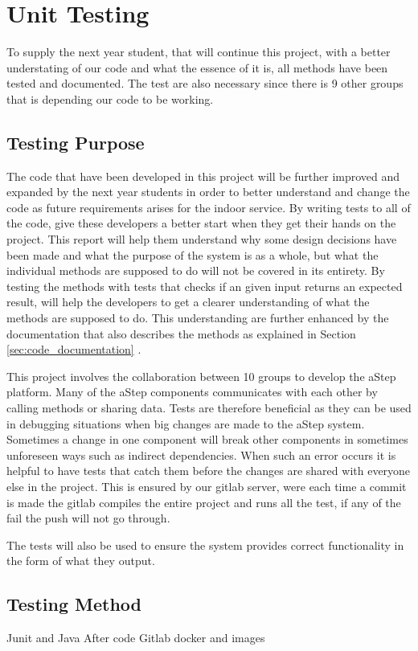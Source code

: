 \section{Unit Testing}
To supply the next year student, that will continue this project, with a better understating of our code and what the essence of it is, all methods have been tested and documented. 
The test are also necessary since there is 9 other groups that is depending our code to be working.

\subsection{Testing Purpose}
The code that have been developed in this project will be further improved and expanded by the next year students in order to better understand and change the code as future requirements arises for the indoor service. 
By writing tests to all of the code, give these developers a better start when they get their hands on the project. 
This report will help them understand why some design decisions have been made and what the purpose of the system is as a whole, but what the individual methods are supposed to do will not be covered in its entirety. 
By testing the methods with tests that checks if an given input returns an expected result, will help the developers to get a clearer understanding of what the methods are supposed to do. 
This understanding are further enhanced by the documentation that also describes the methods as explained in Section \ref{sec:code_documentation} . 

This project involves the collaboration between 10 groups to develop the aStep platform. 
Many of the aStep components communicates with each other by calling methods or sharing data.
Tests are therefore beneficial as they can be used in debugging situations when big changes are made to the aStep system. 
Sometimes a change in one component will break other components in sometimes unforeseen ways such as indirect dependencies.
When such an error occurs it is helpful to have tests that catch them before the changes are shared with everyone else in the project. This is ensured by our gitlab server, were each time a commit is made the gitlab compiles the entire project and runs all the test, if any of the fail the push will not go through.

The tests will also be used to ensure the system provides correct functionality in the form of what they output.




\subsection{Testing Method}
Junit and Java
After code
Gitlab docker and images

